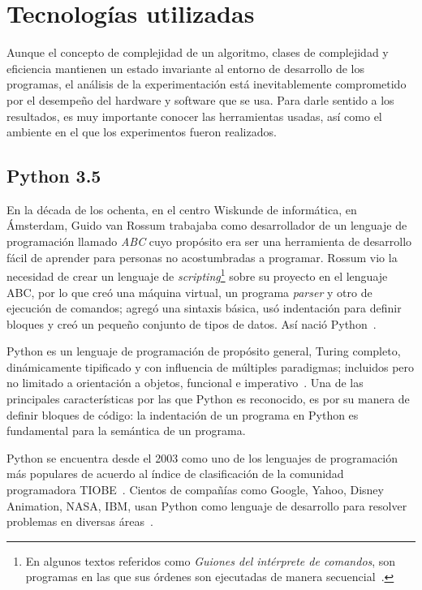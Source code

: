 \chapter{Tecnologías utilizadas}

Aunque el concepto de complejidad de un algoritmo, clases de complejidad y
eficiencia mantienen un estado invariante al entorno de desarrollo de
los programas, el análisis de la experimentación está inevitablemente
comprometido por el desempeño del hardware y software que se usa. Para
darle sentido a los resultados, es muy importante conocer las herramientas 
usadas, así como el ambiente en el que los experimentos fueron realizados.

\section{Python 3.5}

En la década de los ochenta, en el centro Wiskunde de informática, en Ámsterdam,
Guido van Rossum trabajaba como desarrollador de un lenguaje de programación
llamado \textit{ABC} cuyo propósito era ser una herramienta de desarrollo
fácil de aprender para personas no acostumbradas a programar. Rossum vio la
necesidad de crear un lenguaje de \textit{scripting}\footnote{En
algunos textos referidos como \textit{Guiones del intérprete de comandos}, son
programas en las que sus órdenes son ejecutadas de manera
secuencial~\cite{interprete-comandos}.} sobre su proyecto en el lenguaje ABC,
por lo que creó una máquina virtual, un programa \emph{parser} y otro de ejecución de
comandos; agregó una sintaxis básica, usó indentación para definir bloques
y creó un pequeño conjunto de tipos de datos. Así nació
Python~\cite{python-interview}.

Python es un lenguaje de programación de propósito general, Turing completo,
dinámicamente tipificado y con influencia de múltiples paradigmas; incluidos
pero no limitado a orientación a objetos, funcional e imperativo~\cite{python}.
Una de las principales características por las que Python es reconocido, es por
su manera de definir bloques de código: la indentación de un programa en Python
es fundamental para la semántica de un programa.

Python se encuentra desde el 2003 como uno de los lenguajes de programación
más populares de acuerdo al índice de clasificación de la comunidad programadora
TIOBE~\cite{tiobe}. Cientos de compañías como Google, Yahoo, Disney Animation,
NASA, IBM, usan Python como lenguaje de desarrollo para resolver
problemas en diversas áreas~\cite{python-usage}.

